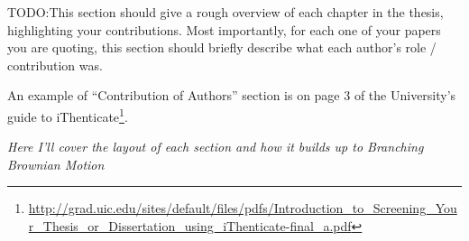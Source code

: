 \authorcontributions

TODO:This section should give a rough overview of each chapter in the thesis,
highlighting your contributions.  Most importantly, for each one of your
papers you are quoting, this section should briefly describe what each author's
role / contribution was.

An example of ``Contribution of Authors'' section is on page 3 of the
University's guide to iThenticate\footnote{\url{http://grad.uic.edu/sites/default/files/pdfs/Introduction_to_Screening_Your_Thesis_or_Dissertation_using_iThenticate-final_a.pdf}}.

\textit{Here I'll cover the layout of each section and how it builds up to Branching Brownian Motion}